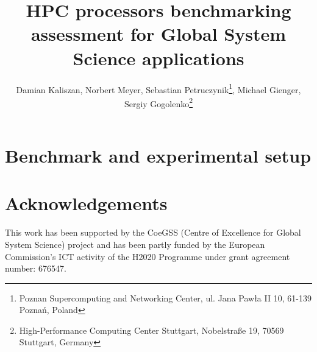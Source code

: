 \documentclass{superfri}
\begin{document}
\author{Damian Kaliszan, Norbert Meyer, Sebastian Petruczynik\footnote{\label{psnc}Poznan Supercomputing and Networking Center, ul. Jana Paw\l a II 10, 61-139 Pozna\'n, Poland}, Michael Gienger, Sergiy Gogolenko\footnote{\label{hlrs}High-Performance Computing Center Stuttgart, Nobelstra\ss{}e 19, 70569 Stuttgart, Germany}}



\title{HPC processors benchmarking assessment for Global System Science applications}

\maketitle{}






\section{Benchmark and experimental setup}






\section*{Acknowledgements}
This work has been supported by the CoeGSS (Centre of Excellence for Global System Science) project and has been partly funded by the European Commission's ICT activity of the H2020 Programme under grant agreement number: 676547.

\openaccess


\end{document}
